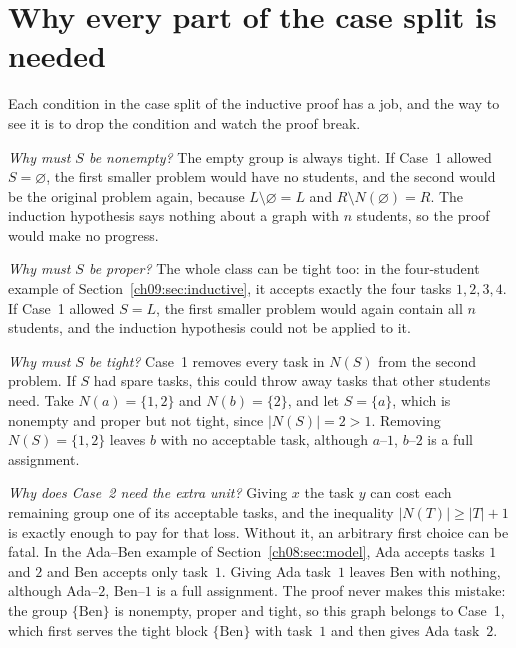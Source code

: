 \section{Why every part of the case split is needed}\label{ch09:sec:case-split}
Each condition in the case split of the inductive proof has a job, and the way to see it is to drop the condition and watch the proof break.

\emph{Why must $S$ be nonempty?} The empty group is always tight. If Case~1 allowed $S=\varnothing$, the first smaller problem would have no students, and the second would be the original problem again, because $L\setminus\varnothing=L$ and $R\setminus N(\varnothing)=R$. The induction hypothesis says nothing about a graph with $n$ students, so the proof would make no progress.

\emph{Why must $S$ be proper?} The whole class can be tight too: in the four-student example of Section~\ref{ch09:sec:inductive}, it accepts exactly the four tasks $1,2,3,4$. If Case~1 allowed $S=L$, the first smaller problem would again contain all $n$ students, and the induction hypothesis could not be applied to it.

\emph{Why must $S$ be tight?} Case~1 removes every task in $N(S)$ from the second problem. If $S$ had spare tasks, this could throw away tasks that other students need. Take $N(a)=\{1,2\}$ and $N(b)=\{2\}$, and let $S=\{a\}$, which is nonempty and proper but not tight, since $|N(S)|=2>1$. Removing $N(S)=\{1,2\}$ leaves $b$ with no acceptable task, although $a$--$1$, $b$--$2$ is a full assignment.


\emph{Why does Case~2 need the extra unit?} Giving $x$ the task $y$ can cost each remaining group one of its acceptable tasks, and the inequality $|N(T)|\ge|T|+1$ is exactly enough to pay for that loss. Without it, an arbitrary first choice can be fatal. In the Ada--Ben example of Section~\ref{ch08:sec:model}, Ada accepts tasks $1$ and $2$ and Ben accepts only task~$1$. Giving Ada task~$1$ leaves Ben with nothing, although Ada--$2$, Ben--$1$ is a full assignment. The proof never makes this mistake: the group $\{\text{Ben}\}$ is nonempty, proper and tight, so this graph belongs to Case~1, which first serves the tight block $\{\text{Ben}\}$ with task~$1$ and then gives Ada task~$2$.

